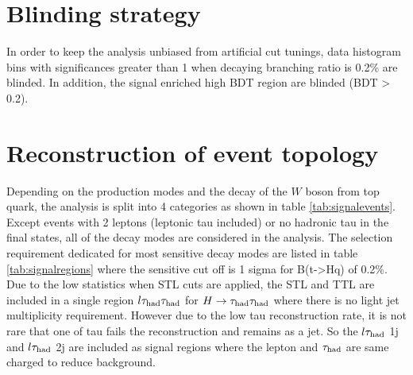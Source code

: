 \section{Blinding strategy}
\label{sec:blind}

In order to keep the analysis unbiased from artificial cut tunings, data histogram bins with significances greater than 1 when decaying branching ratio is 0.2\% are blinded. In addition, the signal enriched high BDT region are blinded (BDT > 0.2).


\section{Reconstruction of event topology}
\label{sec:reconstruction}

Depending on the production modes and the decay of the $W$ boson from top quark, the analysis is split into 4 categories as shown in table \ref{tab:signalevents}. Except events with 2 leptons (leptonic tau included) or no hadronic tau in the final states, all of the decay modes are considered in the analysis. The selection requirement
dedicated for most sensitive decay modes are listed in table \ref{tab:signalregions} where the sensitive cut off is 1 sigma for B(t->Hq) of 0.2\%. Due to the low statistics when STL cuts are applied, the STL and TTL are included in a single region $l\tau_\text{had}{}\tau_\text{had}$ for $H\to\tau_\text{had}{}\tau_\text{had}$ where there is no light jet multiplicity requirement. However due to the low tau reconstruction rate, it is not rare that one of tau fails the reconstruction and remains as a jet. So the $l\tau_\text{had}$ 1j and $l\tau_\text{had}$ 2j are included as signal regions where the lepton and $\tau_\text{had}$ are same charged to reduce background.

